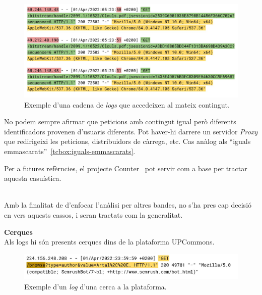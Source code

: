 \begin{figure}[htbp]
    \centerline{\includegraphics[width=\textwidth]{figures/log-repetitions}}
    \captionsetup{justification=centering}
    \caption{Exemple d'una cadena de \textit{logs} que accedeixen al mateix contingut.}\label{fig:log-repetitions}
\end{figure}

\begin{tcolorbox}[colback=green!5!white, colframe=green!50!black, title=Divergència relativa]
    No podem sempre afirmar que peticions amb contingut igual però diferents identificadors provenen d'usuaris diferents.
    Pot haver-hi darrere un servidor \textit{Proxy} que redirigeixi les peticions, distribuidors de càrrega, etc.
    \tcblower
    Cas anàlog als ``iguals emmascarats''~\ref{tcbox:iguals-emmascarats}.
\end{tcolorbox}

\noindent
\begin{tcolorbox}[colback=blue!5!white, colframe=blue!75!black, title=Counter]
    Per a futures refèrncies, el projecte Counter~\cite{counter} pot servir com a base per tractar aquesta casuística.
\end{tcolorbox}

\noindent \\
Amb la finalitat de d'enfocar l'anàlisi per altres bandes, no s'ha pres cap decisió en vers aquests cassos, i seran tractats com la generalitat.

\clearpage

\noindent
\textbf{Cerques} \\

\noindent
Als logs hi són presents cerques dins de la plataforma UPCommons. \\

\begin{figure}[htbp]
    \centerline{\includegraphics[width=\textwidth]{figures/log-search}}
    \captionsetup{justification=centering}
    \caption{Exemple d'un \textit{log} d'una cerca a la plataforma.}\label{fig:log-search}
\end{figure}

